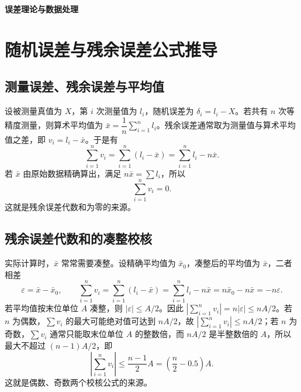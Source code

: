\documentclass[UTF8,12pt,a4paper]{ctexart}
\newcommand{\abs}[1]{\left|#1\right|}
\begin{document}
\begin{center}
    {\huge \textbf{误差理论与数据处理}}
\end{center}
\vspace{1em}

\section{随机误差与残余误差公式推导}

\subsection{测量误差、残余误差与平均值}
设被测量真值为 $X$，第 $i$ 次测量值为 $l_i$，随机误差为 $\delta_i=l_i-X$。若共有 $n$ 次等精度测量，则算术平均值为 $\bar{x}=\dfrac{1}{n}\sum_{i=1}^{n}l_i$。残余误差通常取为测量值与算术平均值之差，即 $v_i=l_i-\bar{x}$。于是有
\begin{equation*}
    \sum_{i=1}^{n}v_i=\sum_{i=1}^{n}(l_i-\bar{x})
    =\sum_{i=1}^{n}l_i-n\bar{x} .
\end{equation*}
若 $\bar{x}$ 由原始数据精确算出，满足 $n\bar{x}=\sum l_i$，所以
\begin{equation*}
    \sum_{i=1}^{n}v_i=0 .
\end{equation*}
这就是残余误差代数和为零的来源。

\subsection{残余误差代数和的凑整校核}
实际计算时，$\bar{x}$ 常常需要凑整。设精确平均值为 $\bar{x}_0$，凑整后的平均值为 $\bar{x}$，二者相差
\begin{equation*}
    \varepsilon=\bar{x}-\bar{x}_0,\qquad
    \sum_{i=1}^{n}v_i
    =\sum_{i=1}^{n}(l_i-\bar{x})
    =\sum_{i=1}^{n}l_i-n\bar{x}
    =n\bar{x}_0-n\bar{x}
    =-n\varepsilon .
\end{equation*}
若平均值按末位单位 $A$ 凑整，则 $\abs{\varepsilon}\le A/2$。因此 $\abs{\sum_{i=1}^{n}v_i}=n\abs{\varepsilon}\le nA/2$。若 $n$ 为偶数，$\sum v_i$ 的最大可能绝对值可达到 $nA/2$，故 $\abs{\sum_{i=1}^{n}v_i}\le nA/2$；若 $n$ 为奇数，$\sum v_i$ 通常只能取末位单位 $A$ 的整数倍，而 $nA/2$ 是半整数倍的 $A$，所以最大不超过 $(n-1)A/2$，即
\begin{equation*}
    \abs{\sum_{i=1}^{n}v_i}\le \frac{n-1}{2}A=\left(\frac{n}{2}-0.5\right)A .
\end{equation*}
这就是偶数、奇数两个校核公式的来源。
\end{document}
